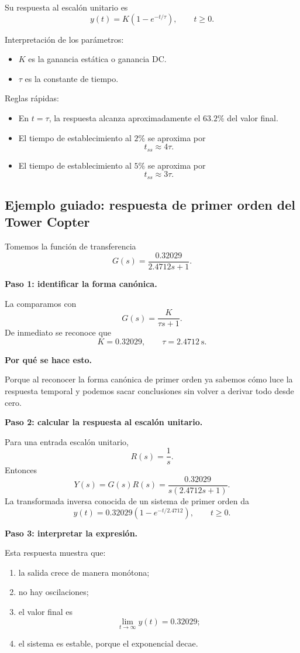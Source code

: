 \documentclass[11pt]{article}
\begin{document}
Su respuesta al escal\'on unitario es
\begin{equation}
y(t)=K\left(1-e^{-t/\tau}\right),\qquad t\ge 0.
\end{equation}

Interpretaci\'on de los par\'ametros:
\begin{itemize}
\item $K$ es la ganancia est\'atica o ganancia DC.
\item $\tau$ es la constante de tiempo.
\end{itemize}

Reglas r\'apidas:
\begin{itemize}
\item En $t=\tau$, la respuesta alcanza aproximadamente el $63.2\%$ del valor final.
\item El tiempo de establecimiento al $2\%$ se aproxima por
\[
t_{ss}\approx 4\tau.
\]
\item El tiempo de establecimiento al $5\%$ se aproxima por
\[
t_{ss}\approx 3\tau.
\]
\end{itemize}

\subsection{Ejemplo guiado: respuesta de primer orden del Tower Copter}
Tomemos la funci\'on de transferencia
\[
G(s)=\frac{0.32029}{2.4712s+1}.
\]

\textbf{Paso 1: identificar la forma can\'onica.}

La comparamos con
\[
G(s)=\frac{K}{\tau s+1}.
\]
De inmediato se reconoce que
\[
K=0.32029,\qquad \tau=2.4712~\text{s}.
\]

\textbf{Por qu\'e se hace esto.}

Porque al reconocer la forma can\'onica de primer orden ya sabemos c\'omo luce la respuesta temporal y podemos sacar conclusiones sin volver a derivar todo desde cero.

\textbf{Paso 2: calcular la respuesta al escal\'on unitario.}

Para una entrada escal\'on unitario,
\[
R(s)=\frac{1}{s}.
\]
Entonces
\[
Y(s)=G(s)R(s)=\frac{0.32029}{s(2.4712s+1)}.
\]
La transformada inversa conocida de un sistema de primer orden da
\[
y(t)=0.32029\left(1-e^{-t/2.4712}\right),\qquad t\ge 0.
\]

\textbf{Paso 3: interpretar la expresi\'on.}

Esta respuesta muestra que:
\begin{enumerate}[label=\arabic*.]
\item la salida crece de manera mon\'otona;
\item no hay oscilaciones;
\item el valor final es
\[
\lim_{t\to\infty}y(t)=0.32029;
\]
\item el sistema es estable, porque el exponencial decae.
\end{enumerate}
\end{document}
